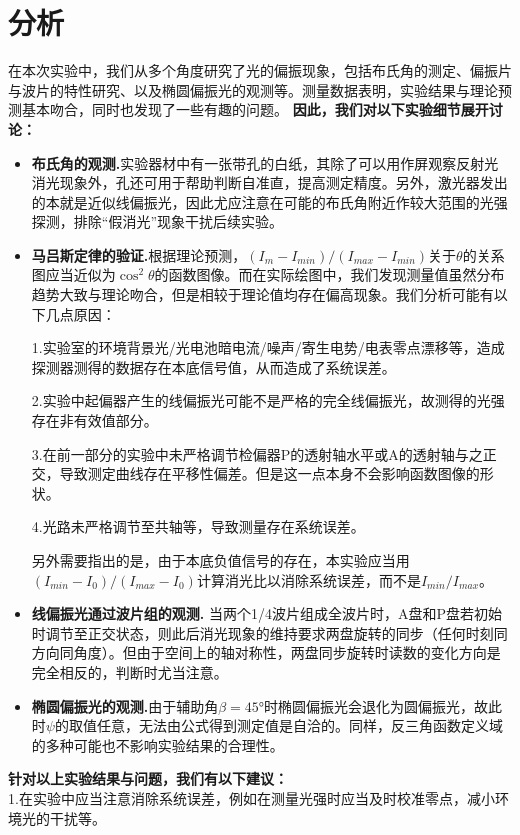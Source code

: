 \documentclass{ctexart}
\begin{document}
 
  

\section{分析}

在本次实验中，我们从多个角度研究了光的偏振现象，包括布氏角的测定、偏振片与波片的特性研究、以及椭圆偏振光的观测等。测量数据表明，实验结果与理论预测基本吻合，同时也发现了一些有趣的问题。
\textbf{因此，我们对以下实验细节展开讨论：}
\begin{itemize}
  \item \textbf{布氏角的观测.}\quad 实验器材中有一张带孔的白纸，其除了可以用作屏观察反射光消光现象外，孔还可用于帮助判断自准直，提高测定精度。另外，激光器发出的本就是近似线偏振光，因此尤应注意在可能的布氏角附近作较大范围的光强探测，排除“假消光”现象干扰后续实验。
  \item \textbf{马吕斯定律的验证.}\quad 根据理论预测，$(I_{m}-I_{min})/(I_{max}-I_{min})$关于$\theta$的关系图应当近似为$\cos^2{\theta}$的函数图像。而在实际绘图中，我们发现测量值虽然分布趋势大致与理论吻合，但是相较于理论值均存在偏高现象。我们分析可能有以下几点原因：
  
  1.实验室的环境背景光/光电池暗电流/噪声/寄生电势/电表零点漂移等，造成探测器测得的数据存在本底信号值，从而造成了系统误差。
  
  2.实验中起偏器产生的线偏振光可能不是严格的完全线偏振光，故测得的光强存在非有效值部分。
  
  3.在前一部分的实验中未严格调节检偏器P的透射轴水平或A的透射轴与之正交，导致测定曲线存在平移性偏差。但是这一点本身不会影响函数图像的形状。

  4.光路未严格调节至共轴等，导致测量存在系统误差。

  另外需要指出的是，由于本底负值信号的存在，本实验应当用$(I_{min}-I_0)/(I_{max}-I_0)$计算消光比以消除系统误差，而不是$I_{min}/I_{max}$。
  \item \textbf{线偏振光通过波片组的观测.} \quad 当两个1/4波片组成全波片时，A盘和P盘若初始时调节至正交状态，则此后消光现象的维持要求两盘旋转的同步（任何时刻同方向同角度）。但由于空间上的轴对称性，两盘同步旋转时读数的变化方向是完全相反的，判断时尤当注意。
  \item \textbf{椭圆偏振光的观测.}\quad 由于辅助角$\beta=45°$时椭圆偏振光会退化为圆偏振光，故此时$\psi$的取值任意，无法由公式得到测定值是自洽的。同样，反三角函数定义域的多种可能也不影响实验结果的合理性。
\end{itemize}
\textbf{针对以上实验结果与问题，我们有以下建议：}\\
\noindent 1.在实验中应当注意消除系统误差，例如在测量光强时应当及时校准零点，减小环境光的干扰等。\\
\end{document}
